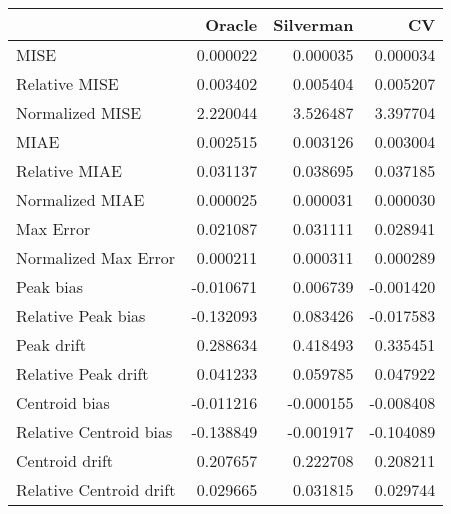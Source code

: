 \begin{tabular}{lrrr}
  \hline
 & Oracle & Silverman & CV \\ 
  \hline
MISE & 0.000022 & 0.000035 & 0.000034 \\ 
  Relative MISE & 0.003402 & 0.005404 & 0.005207 \\ 
  Normalized MISE & 2.220044 & 3.526487 & 3.397704 \\ 
  MIAE & 0.002515 & 0.003126 & 0.003004 \\ 
  Relative MIAE & 0.031137 & 0.038695 & 0.037185 \\ 
  Normalized MIAE & 0.000025 & 0.000031 & 0.000030 \\ 
  Max Error & 0.021087 & 0.031111 & 0.028941 \\ 
  Normalized Max Error & 0.000211 & 0.000311 & 0.000289 \\ 
  Peak bias & -0.010671 & 0.006739 & -0.001420 \\ 
  Relative Peak bias & -0.132093 & 0.083426 & -0.017583 \\ 
  Peak drift & 0.288634 & 0.418493 & 0.335451 \\ 
  Relative Peak drift & 0.041233 & 0.059785 & 0.047922 \\ 
  Centroid bias & -0.011216 & -0.000155 & -0.008408 \\ 
  Relative Centroid bias & -0.138849 & -0.001917 & -0.104089 \\ 
  Centroid drift & 0.207657 & 0.222708 & 0.208211 \\ 
  Relative Centroid drift & 0.029665 & 0.031815 & 0.029744 \\ 
   \hline
\end{tabular}
